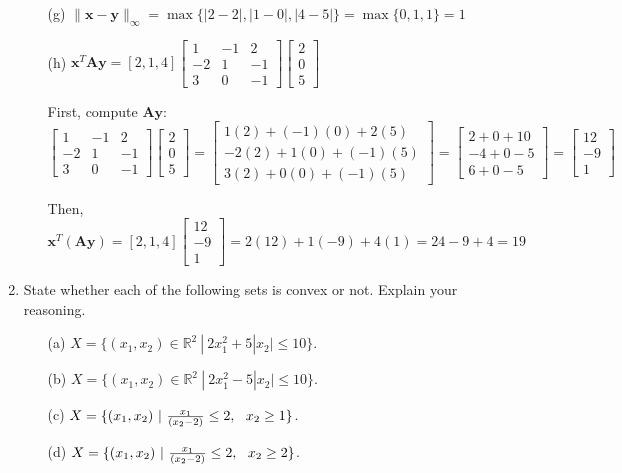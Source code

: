 \documentclass{article}
\begin{document}
\begin{enumerate}
\begin{enumerate}
\item[(g)] $\|\mathbf{x} - \mathbf{y}\|_\infty = \max\{|2-2|, |1-0|, |4-5|\} = \max\{0, 1, 1\} = 1$

\item[(h)] $\mathbf{x}^T\mathbf{A}\mathbf{y} = [2, 1, 4] \begin{bmatrix} 1 & -1 & 2 \\ -2 & 1 & -1 \\ 3 & 0 & -1 \end{bmatrix} \begin{bmatrix} 2 \\ 0 \\ 5 \end{bmatrix}$

First, compute $\mathbf{A}\mathbf{y}$:
$\begin{bmatrix} 1 & -1 & 2 \\ -2 & 1 & -1 \\ 3 & 0 & -1 \end{bmatrix} \begin{bmatrix} 2 \\ 0 \\ 5 \end{bmatrix} = \begin{bmatrix} 1(2) + (-1)(0) + 2(5) \\ -2(2) + 1(0) + (-1)(5) \\ 3(2) + 0(0) + (-1)(5) \end{bmatrix} = \begin{bmatrix} 2 + 0 + 10 \\ -4 + 0 - 5 \\ 6 + 0 - 5 \end{bmatrix} = \begin{bmatrix} 12 \\ -9 \\ 1 \end{bmatrix}$

Then, $\mathbf{x}^T(\mathbf{A}\mathbf{y}) = [2, 1, 4] \begin{bmatrix} 12 \\ -9 \\ 1 \end{bmatrix} = 2(12) + 1(-9) + 4(1) = 24 - 9 + 4 = 19$
\end{enumerate}

\newpage

\item
State whether each of the following sets is convex or not. Explain your reasoning.
\begin{itemize}
\item[(a)] $X = \{ (x_1,x_2)\in\mathbb{R}^2 ~|~ 2x_1^2 + 5|x_2| \le 10 \}$.
\item[(b)] $X = \{ (x_1,x_2)\in\mathbb{R}^2 ~|~ 2x_1^2 - 5|x_2| \le 10 \}$.
\item[(c)] $X = \{ (x_1,x_2) ~|~ {x_1 \over (x_2 - 2)} \le 2, ~~x_2 \ge 1 \}$.
\item[(d)] $X = \{ (x_1,x_2) ~|~ {x_1 \over (x_2 - 2)} \le 2, ~~x_2 \ge 2 \}$.
\end{itemize}


\end{enumerate}
\end{document}
